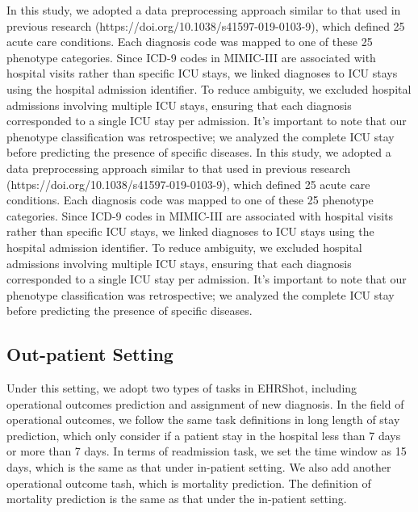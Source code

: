 In this study, we adopted a data preprocessing approach similar to that used in previous research (https://doi.org/10.1038/s41597-019-0103-9), which defined 25 acute care conditions.  Each diagnosis code was mapped to one of these 25 phenotype categories. Since ICD-9 codes in MIMIC-III are associated with hospital visits rather than specific ICU stays, we linked diagnoses to ICU stays using the hospital admission identifier. To reduce ambiguity, we excluded hospital admissions involving multiple ICU stays, ensuring that each diagnosis corresponded to a single ICU stay per admission. It's important to note that our phenotype classification was retrospective; we analyzed the complete ICU stay before predicting the presence of specific diseases. 
In this study, we adopted a data preprocessing approach similar to that used in previous research (https://doi.org/10.1038/s41597-019-0103-9), which defined 25 acute care conditions.  Each diagnosis code was mapped to one of these 25 phenotype categories. Since ICD-9 codes in MIMIC-III are associated with hospital visits rather than specific ICU stays, we linked diagnoses to ICU stays using the hospital admission identifier. To reduce ambiguity, we excluded hospital admissions involving multiple ICU stays, ensuring that each diagnosis corresponded to a single ICU stay per admission. It's important to note that our phenotype classification was retrospective; we analyzed the complete ICU stay before predicting the presence of specific diseases. 

\subsection{Out-patient Setting}
Under this setting, we adopt two types of tasks in EHRShot, including operational outcomes prediction and assignment of new diagnosis. In the field of operational outcomes, we follow the same task definitions in long length of stay prediction, which only consider if a patient stay in the hospital less than 7 days or more than 7 days. In terms of readmission task, we set the time window as 15 days, which is the same as that under in-patient setting. We also add another operational outcome tash, which is mortality prediction. The definition of mortality prediction is the same as that under the in-patient setting.

